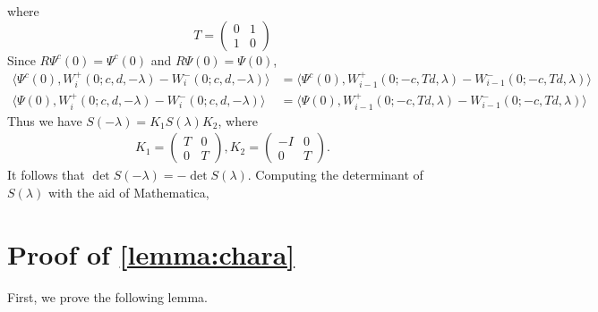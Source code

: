 \documentclass[thesis.tex]{subfiles}
\begin{document}
where 
\[
T = \begin{pmatrix} 0 & 1 \\ 1 & 0 \end{pmatrix}
\]
Since $R \Psi^c(0) = \Psi^c(0)$ and $R \Psi(0) = \Psi(0)$,
\begin{align*}
\langle \Psi^c(0), W_i^+(0; c, d, -\lambda) - W_i^-(0; c, d, -\lambda) \rangle &= \langle \Psi^c(0), W_{i-1}^+(0; -c, T d, \lambda) - W_{i-1}^-(0; -c, T d, \lambda) \rangle \\
\langle \Psi(0), W_i^+(0; c, d, -\lambda) - W_i^-(0; c, d, -\lambda) \rangle &= \langle \Psi(0), W_{i-1}^+(0; -c, T d, \lambda) - W_{i-1}^-(0; -c, T d, \lambda) \rangle 
\end{align*}
Thus we have $S(-\lambda) = K_1 S(\lambda) K_2$, where
\begin{align*}
K_1 = \begin{pmatrix}T & 0 \\ 0 & T \end{pmatrix}, 
K_2 = \begin{pmatrix}-I & 0 \\ 0 & T \end{pmatrix}.
\end{align*}
It follows that $\det S(-\lambda) = -\det S(\lambda)$. Computing the determinant of $S(\lambda)$ with the aid of Mathematica,


\section{Proof of \cref{lemma:chara} }

First, we prove the following lemma. 
\end{document}
